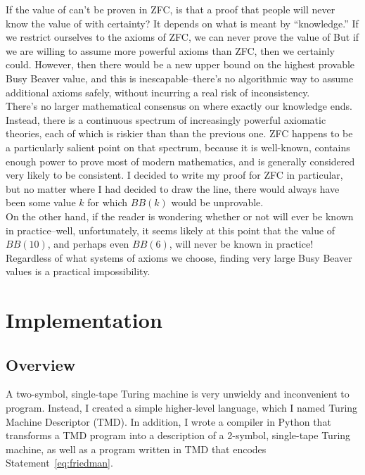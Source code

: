 If the value of \bbstatenum can't be proven in ZFC, is that a proof that people will never know the value of \bbstatenum with certainty? It depends on what is meant by ``knowledge.'' If we restrict ourselves to the axioms of ZFC, we can never prove the value of \bbstatenumperiod But if we are willing to assume more powerful axioms than ZFC, then we certainly could. However, then there would be a new upper bound on the highest provable Busy Beaver value, and this is inescapable--there's no algorithmic way to assume additional axioms safely, without incurring a real risk of inconsistency.  \\

There's no larger mathematical consensus on where exactly our knowledge ends. Instead, there is a continuous spectrum of increasingly powerful axiomatic theories, each of which is riskier than than the previous one. ZFC happens to be a particularly salient point on that spectrum, because it is well-known, contains enough power to prove most of modern mathematics, and is generally considered very likely to be consistent. I decided to write my proof for ZFC in particular, but no matter where I had decided to draw the line, there would always have been some value $k$ for which $BB(k)$ would be unprovable. \\

On the other hand, if the reader is wondering whether or not \bbstatenum will ever be known in practice--well, unfortunately, it seems likely at this point that the value of $BB(10)$, and perhaps even $BB(6)$, will never be known in practice! Regardless of what systems of axioms we choose, finding very large Busy Beaver values is a practical impossibility.~\cite{bbimpossible}

\chapter{Implementation \label{sec:implementation}}

\section{Overview}

A two-symbol, single-tape Turing machine is very unwieldy and inconvenient to program. Instead, I created a simple higher-level language, which I named Turing Machine Descriptor (TMD). In addition, I wrote a compiler in Python that transforms a TMD program into a description of a 2-symbol, single-tape Turing machine, as well as a program written in TMD that encodes Statement~\ref{eq:friedman}. \\
 

